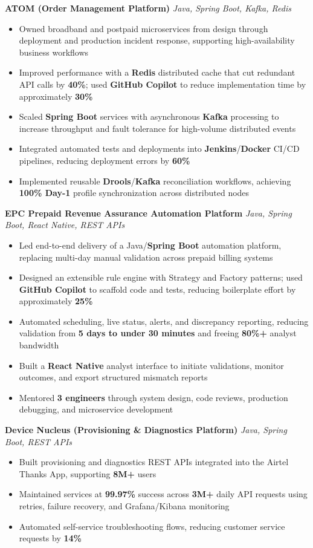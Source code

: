 \documentclass[letterpaper,11pt]{article}
\newcommand{\resumeItem}[1]{
  \item\small{{#1 \vspace{-2pt}}}
}
\newcommand{\resumeItemListStart}{\begin{itemize}}
\newcommand{\resumeItemListEnd}{\end{itemize}\vspace{-5pt}}
\begin{document}
      \vspace{4pt}
      \textbf{\small ATOM (Order Management Platform)} \hfill \textit{\small Java, Spring Boot, Kafka, Redis} \\
      \vspace{-2pt}
      \resumeItemListStart
        \resumeItem{Owned broadband and postpaid microservices from design through deployment and production incident response, supporting high-availability business workflows}
        \resumeItem{Improved performance with a \textbf{Redis} distributed cache that cut redundant API calls by \textbf{40\%}; used \textbf{GitHub Copilot} to reduce implementation time by approximately \textbf{30\%}}
        \resumeItem{Scaled \textbf{Spring Boot} services with asynchronous \textbf{Kafka} processing to increase throughput and fault tolerance for high-volume distributed events}
        \resumeItem{Integrated automated tests and deployments into \textbf{Jenkins}/\textbf{Docker} CI/CD pipelines, reducing deployment errors by \textbf{60\%}}
        \resumeItem{Implemented reusable \textbf{Drools}/\textbf{Kafka} reconciliation workflows, achieving \textbf{100\% Day-1} profile synchronization across distributed nodes}
      \resumeItemListEnd

      \vspace{4pt}
      \textbf{\small EPC Prepaid Revenue Assurance Automation Platform} \hfill \textit{\small Java, Spring Boot, React Native, REST APIs} \\
      \vspace{-2pt}
      \resumeItemListStart
        \resumeItem{Led end-to-end delivery of a Java/\textbf{Spring Boot} automation platform, replacing multi-day manual validation across prepaid billing systems}
        \resumeItem{Designed an extensible rule engine with Strategy and Factory patterns; used \textbf{GitHub Copilot} to scaffold code and tests, reducing boilerplate effort by approximately \textbf{25\%}}
        \resumeItem{Automated scheduling, live status, alerts, and discrepancy reporting, reducing validation from \textbf{5 days to under 30 minutes} and freeing \textbf{80\%+} analyst bandwidth}
        \resumeItem{Built a \textbf{React Native} analyst interface to initiate validations, monitor outcomes, and export structured mismatch reports}
        \resumeItem{Mentored \textbf{3 engineers} through system design, code reviews, production debugging, and microservice development}
      \resumeItemListEnd

      \vspace{4pt}
      \textbf{\small Device Nucleus (Provisioning \& Diagnostics Platform)} \hfill \textit{\small Java, Spring Boot, REST APIs} \\
      \vspace{-2pt}
      \resumeItemListStart
        \resumeItem{Built provisioning and diagnostics REST APIs integrated into the Airtel Thanks App, supporting \textbf{8M+} users}
        \resumeItem{Maintained services at \textbf{99.97\%} success across \textbf{3M+} daily API requests using retries, failure recovery, and Grafana/Kibana monitoring}
        \resumeItem{Automated self-service troubleshooting flows, reducing customer service requests by \textbf{14\%}}
      \resumeItemListEnd
\end{document}
